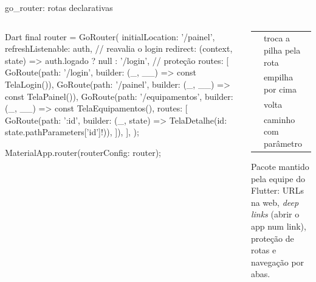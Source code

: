 \documentclass[aspectratio=169,10pt]{beamer}
\begin{document}
\begin{frame}[fragile]{go\_router: rotas declarativas}
  \begin{columns}[T]
    \begin{column}{0.58\textwidth}
\begin{codigo}[title=lib/routing/router.dart]{Dart}
final router = GoRouter(
  initialLocation: '/painel',
  refreshListenable: auth,                // reavalia o login
  redirect: (context, state) =>
      auth.logado ? null : '/login',      // proteção
  routes: [
    GoRoute(path: '/login',
        builder: (_, __) => const TelaLogin()),
    GoRoute(path: '/painel',
        builder: (_, __) => const TelaPainel()),
    GoRoute(path: '/equipamentos',
      builder: (_, __) => const TelaEquipamentos(),
      routes: [
        GoRoute(path: ':id', builder: (_, state) =>
            TelaDetalhe(id: state.pathParameters['id']!)),
      ]),
  ],
);

MaterialApp.router(routerConfig: router);
\end{codigo}
    \end{column}
    \begin{column}{0.4\textwidth}
      \scriptsize
      \begin{tabularx}{\linewidth}{@{}l L@{}}
        \toprule
         &  \\
        \midrule
         & troca a pilha pela rota \\
         & empilha por cima \\
         & volta \\
         & caminho com parâmetro \\
        \bottomrule
      \end{tabularx}
      \begin{conceito}
        Pacote mantido pela equipe do Flutter: URLs na web, \emph{deep links} (abrir o app num link), proteção de rotas e navegação por abas.
      \end{conceito}
    \end{column}
  \end{columns}
\end{frame}
\end{document}
